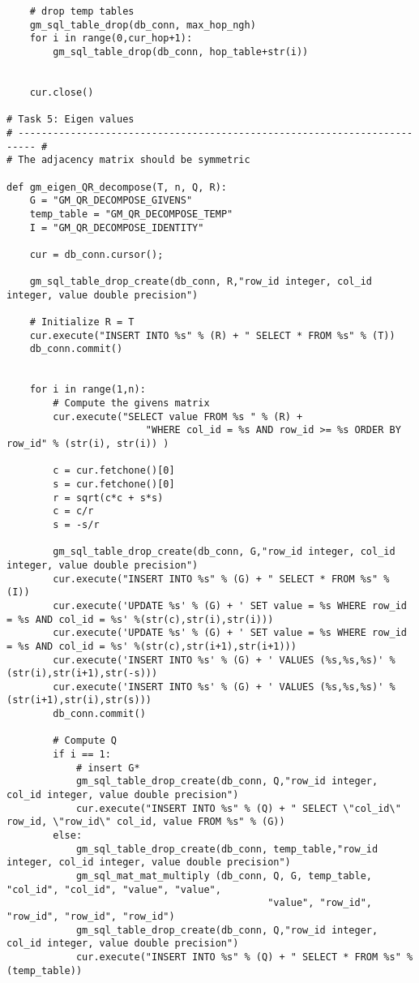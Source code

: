 \documentclass[11pt]{article}
\begin{document}
\begin{lstlisting}
    # drop temp tables
    gm_sql_table_drop(db_conn, max_hop_ngh)
    for i in range(0,cur_hop+1):
        gm_sql_table_drop(db_conn, hop_table+str(i))
    

    cur.close()
    
# Task 5: Eigen values
# ------------------------------------------------------------------------- #
# The adjacency matrix should be symmetric

def gm_eigen_QR_decompose(T, n, Q, R):
    G = "GM_QR_DECOMPOSE_GIVENS"
    temp_table = "GM_QR_DECOMPOSE_TEMP"
    I = "GM_QR_DECOMPOSE_IDENTITY"
    
    cur = db_conn.cursor();
    
    gm_sql_table_drop_create(db_conn, R,"row_id integer, col_id integer, value double precision")
 
    # Initialize R = T
    cur.execute("INSERT INTO %s" % (R) + " SELECT * FROM %s" % (T))
    db_conn.commit()
    
    
    for i in range(1,n):
        # Compute the givens matrix
        cur.execute("SELECT value FROM %s " % (R) + 
                        "WHERE col_id = %s AND row_id >= %s ORDER BY row_id" % (str(i), str(i)) )
         
        c = cur.fetchone()[0]
        s = cur.fetchone()[0]
        r = sqrt(c*c + s*s)
        c = c/r
        s = -s/r
        
        gm_sql_table_drop_create(db_conn, G,"row_id integer, col_id integer, value double precision")
        cur.execute("INSERT INTO %s" % (G) + " SELECT * FROM %s" % (I))
        cur.execute('UPDATE %s' % (G) + ' SET value = %s WHERE row_id = %s AND col_id = %s' %(str(c),str(i),str(i)))
        cur.execute('UPDATE %s' % (G) + ' SET value = %s WHERE row_id = %s AND col_id = %s' %(str(c),str(i+1),str(i+1)))
        cur.execute('INSERT INTO %s' % (G) + ' VALUES (%s,%s,%s)' %(str(i),str(i+1),str(-s)))
        cur.execute('INSERT INTO %s' % (G) + ' VALUES (%s,%s,%s)' %(str(i+1),str(i),str(s)))
        db_conn.commit()
       
        # Compute Q
        if i == 1:
            # insert G*
            gm_sql_table_drop_create(db_conn, Q,"row_id integer, col_id integer, value double precision")
            cur.execute("INSERT INTO %s" % (Q) + " SELECT \"col_id\" row_id, \"row_id\" col_id, value FROM %s" % (G))
        else:
            gm_sql_table_drop_create(db_conn, temp_table,"row_id integer, col_id integer, value double precision")
            gm_sql_mat_mat_multiply (db_conn, Q, G, temp_table, "col_id", "col_id", "value", "value", 
                                             "value", "row_id", "row_id", "row_id", "row_id")
            gm_sql_table_drop_create(db_conn, Q,"row_id integer, col_id integer, value double precision")
            cur.execute("INSERT INTO %s" % (Q) + " SELECT * FROM %s" % (temp_table))


\end{lstlisting}
\end{document}
